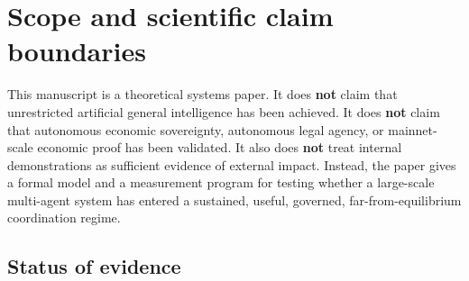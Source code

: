 \section{Scope and scientific claim
boundaries}\label{scope-and-scientific-claim-boundaries}

This manuscript is a theoretical systems paper. It does \textbf{not}
claim that unrestricted artificial general intelligence has been
achieved. It does \textbf{not} claim that autonomous economic
sovereignty, autonomous legal agency, or mainnet-scale economic proof
has been validated. It also does \textbf{not} treat internal
demonstrations as sufficient evidence of external impact. Instead, the
paper gives a formal model and a measurement program for testing whether
a large-scale multi-agent system has entered a sustained, useful,
governed, far-from-equilibrium coordination regime.

\subsection{Status of evidence}\label{status-of-evidence}

